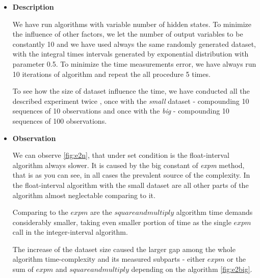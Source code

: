 \documentclass[thesis=M,english]{FITthesis}[2012/10/20]
\begin{document}
\begin{itemize}
\item \textbf{ Description }

We have run algorithms with variable number of hidden states. To minimize the influence of other factors, we let the number of output variables to be constantly 10 and we have used always the same randomly generated dataset, with the integral times intervals generated by exponential distribution with parameter 0.5. To minimize the time measurements error, we have always run 10 iterations of algorithm and repeat the all procedure 5 times. 

To see how the size of dataset influence the time, we have conducted all the described experiment twice , once with the \textit{small} dataset - compounding 10 sequences of 10 observations and once with the \textit{big} - compounding 10 sequences of 100 observations.  

\item \textbf{ Observation }

We can observe \ref{fig:e2n}, that under set condition is the float-interval algorithm always slower. It is caused by the big constant of \textit{expm} method, that is as you can see, in all cases the prevalent source of the complexity. In the float-interval algorithm with the small dataset are all other parts of the algorithm almost neglectable comparing to it.

Comparing to the $expm$ are the $square and multiply$ algorithm time demands considerably smaller, taking even smaller portion of time as the single $expm$ call in the integer-interval algorithm.

The increase of the dataset size caused the larger gap among the whole algorithm time-complexity and its measured subparts - either $expm$ or the sum of $expm$ and $square and multiply$ depending on the algorithm \ref{fig:e2big}.   


\end{itemize}
\end{document}
